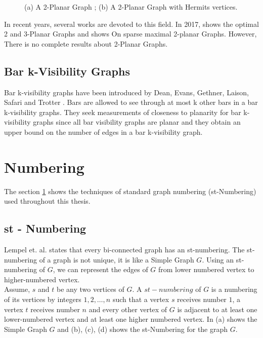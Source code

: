 \begin{figure}[!tb]
  \centering
\resizebox{150mm}{!}{}
\caption{(a) A 2-Planar Graph ; (b) A 2-Planar Graph with Hermits vertices.}
\label{fig:2p}
\end{figure}


In recent years, several works are devoted to this field. In 2017, \cite{michael} shows the optimal 2 and 3-Planar Graphs and \cite{Christopher} shows On sparse maximal 2-planar Graphs. However, There is no complete results about 2-Planar Graphs.



\subsection{Bar k-Visibility Graphs}

Bar k-visibility graphs have been introduced by Dean, Evans, Gethner, Laison, Safari and Trotter \cite{M}. Bars are allowed to see through at most k other bars in a bar k-visibility graphs. They seek measurements of closeness to planarity for bar k-visibility graphs since all bar visibility graphs are planar and they obtain an upper bound on the number of edges in a bar k-visibility graph.



\section{Numbering}
\label{number}

The section \cref{number} shows the techniques of standard graph numbering (st-Numbering) used
throughout this thesis.


\subsection{st - Numbering}

Lempel et. al. \cite{Even} states that every bi-connected graph has an st-numbering. The st-numbering of a graph is not unique, it is like a Simple Graph $G$. Using an st-numbering of $G$, we can represent the edges of $G$ from lower numbered vertex to higher-numbered vertex.
\\
Assume, $s$ and $t$ be any two vertices of $G$. A $st-numbering$ of
$G$ is a numbering of its vertices by integers $1, 2, \ldots , n$ such that a vertex $s$
receives number $1$, a vertex $t$ receives number $n$ and every other vertex of
$G$ is adjacent to at least one lower-numbered vertex and at least one higher numbered vertex.
In  (a) shows the Simple Graph $G$ and (b), (c), (d) shows the st-Numbering for the graph $G$.

